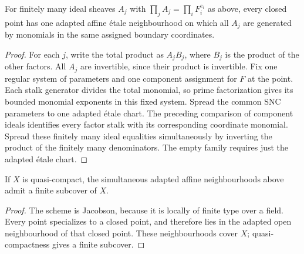 \begin{lemma}\label{lem:sc0-snc-simultaneous-neighbourhood}
\leanok
{}
For finitely many ideal sheaves $A_j$ with $\prod_j A_j=\prod_i F_i^{e_i}$ as above, every closed
point has one adapted affine \'etale neighbourhood on which all $A_j$ are generated by monomials
in the same assigned boundary coordinates.
\end{lemma}
\begin{proof}
For each $j$, write the total product as $A_jB_j$, where $B_j$ is the product of the other
factors. All $A_j$ are invertible, since their product is invertible. Fix one regular system
of parameters and one component assignment for $F$ at the point. Each stalk generator divides
the total monomial, so prime factorization gives its bounded monomial exponents in this fixed
system. Spread the common SNC parameters to one adapted \'etale chart. The preceding comparison
of component ideals identifies every factor stalk with its corresponding coordinate monomial.
Spread these finitely many ideal equalities simultaneously by inverting the product of the
finitely many denominators. The empty family requires just the adapted \'etale chart.
\end{proof}

\begin{lemma}\label{lem:sc0-snc-simultaneous-finite-cover}
\leanok
{}
If $X$ is quasi-compact, the simultaneous adapted affine neighbourhoods above admit a finite
subcover of $X$.
\end{lemma}
\begin{proof}
The scheme is Jacobson, because it is locally of finite type over a field. Every point specializes
to a closed point, and therefore lies in the adapted open neighbourhood of that closed point.
These neighbourhoods cover $X$; quasi-compactness gives a finite subcover.
\end{proof}

